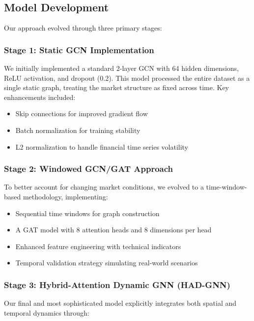 \documentclass[12pt]{article}
\begin{document}
\subsection{Model Development}

Our approach evolved through three primary stages:

\subsubsection{Stage 1: Static GCN Implementation}

We initially implemented a standard 2-layer GCN with 64 hidden dimensions, ReLU activation, and dropout (0.2). This model processed the entire dataset as a single static graph, treating the market structure as fixed across time. Key enhancements included:
\begin{itemize}
    \item Skip connections for improved gradient flow
    \item Batch normalization for training stability
    \item L2 normalization to handle financial time series volatility
\end{itemize}

\subsubsection{Stage 2: Windowed GCN/GAT Approach}

To better account for changing market conditions, we evolved to a time-window-based methodology, implementing:
\begin{itemize}
    \item Sequential time windows for graph construction
    \item A GAT model with 8 attention heads and 8 dimensions per head
    \item Enhanced feature engineering with technical indicators
    \item Temporal validation strategy simulating real-world scenarios
\end{itemize}

\subsubsection{Stage 3: Hybrid-Attention Dynamic GNN (HAD-GNN)}

Our final and most sophisticated model explicitly integrates both spatial and temporal dynamics through:
\end{document}
